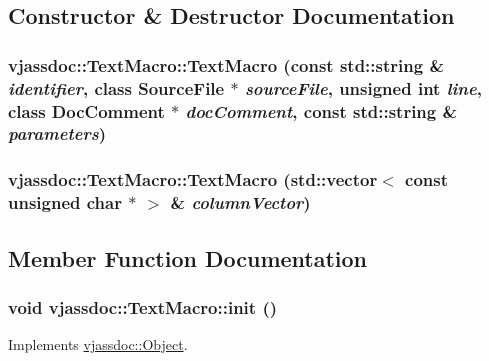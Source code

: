 \subsection{Constructor \& Destructor Documentation}
\hypertarget{classvjassdoc_1_1TextMacro_7354fb20a513ca489afe554896f039ef}{
\subsubsection{\setlength{\rightskip}{0pt plus 5cm}vjassdoc::TextMacro::TextMacro (const std::string \& {\em identifier}, class {\bf SourceFile} $\ast$ {\em sourceFile}, unsigned int {\em line}, class {\bf DocComment} $\ast$ {\em docComment}, const std::string \& {\em parameters})}}
\label{classvjassdoc_1_1TextMacro_7354fb20a513ca489afe554896f039ef}


\hypertarget{classvjassdoc_1_1TextMacro_c82712ca934e5a59bff730add064ec78}{
\subsubsection{\setlength{\rightskip}{0pt plus 5cm}vjassdoc::TextMacro::TextMacro (std::vector$<$ const unsigned char $\ast$ $>$ \& {\em columnVector})}}
\label{classvjassdoc_1_1TextMacro_c82712ca934e5a59bff730add064ec78}




\subsection{Member Function Documentation}
\hypertarget{classvjassdoc_1_1TextMacro_816bdd2b838a4f1148ea17e5723e8577}{
\subsubsection{\setlength{\rightskip}{0pt plus 5cm}void vjassdoc::TextMacro::init ()}}
\label{classvjassdoc_1_1TextMacro_816bdd2b838a4f1148ea17e5723e8577}




Implements \hyperlink{classvjassdoc_1_1Object_bd43e77dbe80055f5adda67661dfaca4}{vjassdoc::Object}.

